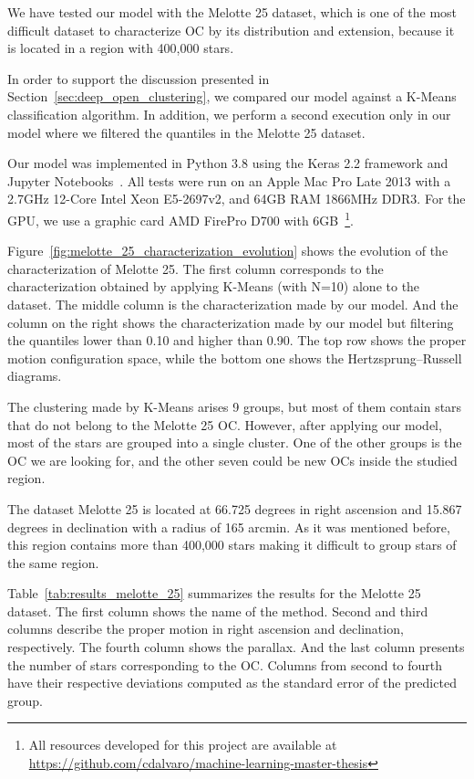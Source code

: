 \documentclass[11pt,a4paper,english,twocolumn]{article}
\begin{document}
We have tested our model with the Melotte 25 dataset, which is one of the most difficult dataset
to characterize OC by its distribution and extension, because it is located in a region with
400,000 stars.

In order to support the discussion presented in Section~\ref{sec:deep_open_clustering}, we compared
our model against a K-Means classification algorithm. In addition, we perform a second execution
only in our model where we filtered the quantiles in the Melotte 25 dataset.

Our model was implemented in Python 3.8 using the Keras 2.2 framework and Jupyter
Notebooks~\cite{Kluyver2016jupyter}. All tests were run on an Apple Mac Pro Late 2013 with a
2.7GHz 12-Core Intel Xeon E5-2697v2, and 64GB RAM 1866MHz DDR3. For the GPU, we use a graphic
card AMD FirePro D700 with 6GB~\footnote{All resources developed for this project are available
at \href{https://github.com/cdalvaro/machine-learning-master-thesis}
{https://github.com/cdalvaro/machine-learning-master-thesis}}.


Figure~\ref{fig:melotte_25_characterization_evolution} shows the evolution of the characterization
of Melotte 25. The first column corresponds to the characterization obtained by applying K-Means
(with N=10) alone to the dataset. The middle column is the characterization made by our model.
And the column on the right shows the characterization made by our model but filtering the
quantiles lower than 0.10 and higher than 0.90. The top row shows the proper motion configuration
space, while the bottom one shows the Hertzsprung–Russell diagrams.


The clustering made by K-Means arises 9 groups, but most of them contain stars that do not belong
to the Melotte 25 OC. However, after applying our model, most of the stars are grouped into a single
cluster. One of the other groups is the OC we are looking for, and the other seven could be new OCs
inside the studied region.

The dataset Melotte 25 is located at 66.725 degrees in right ascension and 15.867 degrees in
declination with a radius of 165 arcmin. As it was mentioned before, this region contains more than
400,000 stars making it difficult to group stars of the same region.

Table~\ref{tab:results_melotte_25} summarizes the results for the Melotte 25 dataset. The first column
shows the name of the method. Second and third columns describe the proper motion in right ascension and
declination, respectively. The fourth column shows the parallax. And the last column presents the number
of stars corresponding to the OC. Columns from second to fourth have their respective deviations computed
as the standard error of the predicted group.
\end{document}
